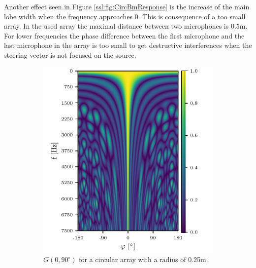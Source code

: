 Another effect seen in Figure \ref*{ssl:fig:CircBmResponse} is the increase
of the main lobe width when the frequency approaches 0.
This is consequence of a too small array. 
In the used array the maximal distance between two microphones is 0.5m.
For lower frequencies the phase difference between the first microphone and 
the last microphone in the array is too small to get destructive
interferences when the steering vector is not focused on the source.


\begin{figure}[h]
	\centering
	\begin{subfigure}[t]{0.45\textwidth}
		\centering
		\includegraphics[width=\textwidth]{circ_f_sweep_0.pdf}
		\caption{$G(0, 90^\circ)$ for a circular array with a radius of 0.25m.}
		\label{ssl:fig:f_dep0}
	\end{subfigure}
	\hfill
	\begin{subfigure}[t]{0.45\textwidth}
		\centering

\end{subfigure}
\end{figure}
